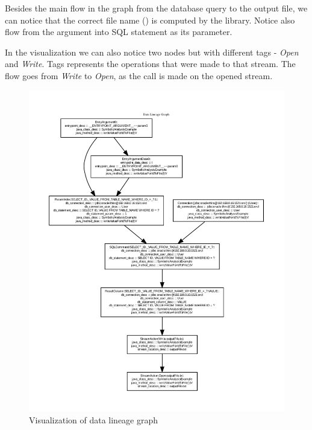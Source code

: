 Besides the main flow in the graph from the database query to the output file, we can
notice that the correct file name () is computed by the library.
Notice also flow from the  argument into SQL statement as its parameter.

In the visualization we can also notice two  nodes but with different
tags - \textit{Open} and \textit{Write}.
Tags represents the operations that were made to that stream. The flow
goes from \textit{Write} to \textit{Open}, as the  call is made on the opened stream.

\begin{figure}[p]
  \includegraphics[trim={1cm 1cm 1cm 1.8cm},clip,width=\textwidth]{img/Examples2-writeValueForIdToFile.pdf}
  \caption{Visualization of data lineage graph}
  \label{frameworks:dbio:graph}
  \hspace{-15mm}
\end{figure}

